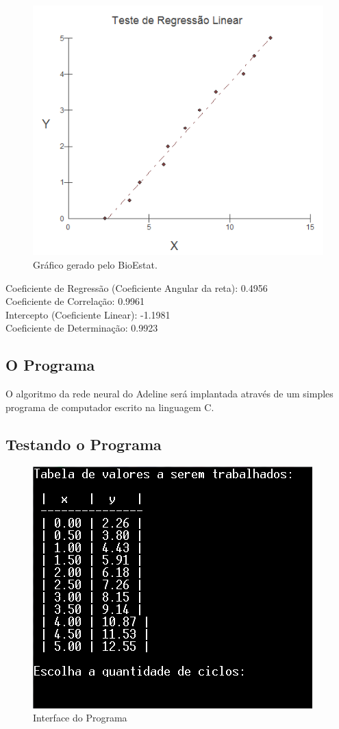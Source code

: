 \begin{figure}[H]
	\center
	\includegraphics[scale=1]{imagens/graflin.png}
	\caption{Gráfico gerado pelo BioEstat.}
\end{figure}

Coeficiente de Regressão (Coeficiente Angular da reta): 0.4956\\
Coeficiente de Correlação: 0.9961\\
Intercepto (Coeficiente Linear): -1.1981\\
Coeficiente de Determinação: 0.9923\\


\subsection{O Programa}

O algoritmo da rede neural do Adeline será implantada através de um simples programa de computador escrito na linguagem C.


\subsection{Testando o Programa}

\begin{figure}[h]
	\center
	\includegraphics[scale = 1]{imagens/interf.png}
	\caption{Interface do Programa}
\end{figure}

